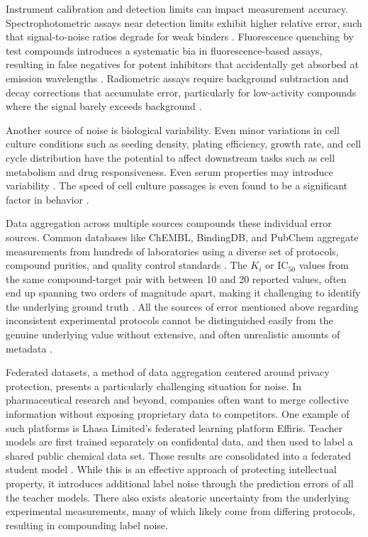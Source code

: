 Instrument calibration and detection limits can impact measurement accuracy. Spectrophotometric assays near detection limits exhibit higher relative error, such that signal-to-noise ratios degrade for weak binders \citep{Zhang1999}. Fluorescence quenching by test compounds introduces a systematic bia in fluorescence-based assays, resulting in false negatives for potent inhibitors that accidentally get absorbed at emission wavelengths \citep{Simeonov2008}. Radiometric assays require background subtraction and decay corrections that accumulate error, particularly for low-activity compounds where the signal barely exceeds background \citep{Zhang1999}.

Another source of noise is biological variability. Even minor variations in cell culture conditions such as seeding density, plating efficiency, growth rate, and cell cycle distribution have the potential to affect downstream tasks such as cell metabolism and drug responsiveness. Even serum properties may introduce variability \citep{Hatzis2014}. The speed of cell culture passages is even found to be a significant factor in behavior \citep{Postnikova2018}. 

Data aggregation across multiple sources compounds these individual error sources. Common databases like ChEMBL, BindingDB, and PubChem aggregate measurements from hundreds of laboratories using a diverse set of protocols, compound purities, and quality control standards \citep{Gaulton2017, Gilson2016}. The $K_i$ or IC$_{50}$ values from the same compound-target pair with between 10 and 20 reported values, often end up spanning two orders of magnitude apart, making it challenging to identify the underlying ground truth \citep{Kramer2012}. All the sources of error mentioned above regarding inconsistent experimental protocols cannot be distinguished easily from the genuine underlying value without extensive, and often unrealistic amounts of metadata \citep{Fourches2016}.


Federated datasets, a method of data aggregation centered around privacy protection, presents a particularly challenging situation for noise. In pharmaceutical research and beyond, companies often want to merge collective information without exposing proprietary data to competitors. One example of such platforms is Lhasa Limited's federated learning platform Effiris. Teacher models are first trained separately on confidental data, and then used to label a shared public chemical data set. Those results are consolidated into a federated student model \citep{Bassani2023}. While this is an effective approach of protecting intellectual property, it introduces additional label noise through the prediction errors of all the teacher models. There also exists aleatoric uncertainty from the underlying experimental measurements, many of which likely come from differing protocols, resulting in compounding label noise. 

